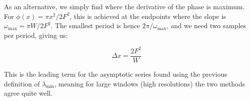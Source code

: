 \documentclass{article}
\begin{document}
    As an alternative, we simply find where the derivative of the phase is
    maximum. For $\phi(x)=\pi{x}^{2}/2F^{2}$, this is achieved at the endpoints
    where the slope is $\omega_{\textrm{max}}=\pi{W}/2F^{2}$.
    The smallest period is hence $2\pi/\omega_{\textrm{max}}$, and we need
    two samples per period, giving us:

    \begin{equation}
        \Delta{x}
        =
        \frac{2F^{2}}{{W}}
    \end{equation}

    This is the leading term for the asymptotic series found using the
    previous definition of $\lambda_{\textrm{min}}$, meaning for large windows
    (high resolutions) the two methods agree quite well.
\end{document}
